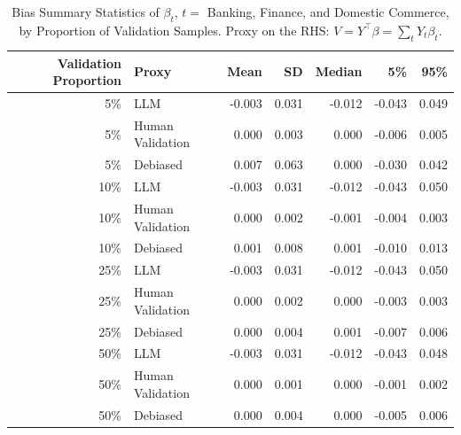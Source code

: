 \begin{table}

\caption{Bias Summary Statistics of $\beta_{t}$, $t=$ Banking, Finance, and Domestic Commerce, by Proportion of Validation Samples.
      Proxy on the RHS: $V = Y^\top \beta = \sum_{t} Y_t \beta_t$.}
\centering
\begin{tabular}[t]{rlrrrrr}
\toprule
Validation Proportion & Proxy & Mean & SD & Median & 5\% & 95\%\\
\midrule
5\% & LLM & -0.003 & 0.031 & -0.012 & -0.043 & 0.049\\
5\% & Human Validation & 0.000 & 0.003 & 0.000 & -0.006 & 0.005\\
5\% & Debiased & 0.007 & 0.063 & 0.000 & -0.030 & 0.042\\
10\% & LLM & -0.003 & 0.031 & -0.012 & -0.043 & 0.050\\
10\% & Human Validation & 0.000 & 0.002 & -0.001 & -0.004 & 0.003\\
10\% & Debiased & 0.001 & 0.008 & 0.001 & -0.010 & 0.013\\
25\% & LLM & -0.003 & 0.031 & -0.012 & -0.043 & 0.050\\
25\% & Human Validation & 0.000 & 0.002 & 0.000 & -0.003 & 0.003\\
25\% & Debiased & 0.000 & 0.004 & 0.001 & -0.007 & 0.006\\
50\% & LLM & -0.003 & 0.031 & -0.012 & -0.043 & 0.048\\
50\% & Human Validation & 0.000 & 0.001 & 0.000 & -0.001 & 0.002\\
50\% & Debiased & 0.000 & 0.004 & 0.000 & -0.005 & 0.006\\
\bottomrule
\end{tabular}
\end{table}
